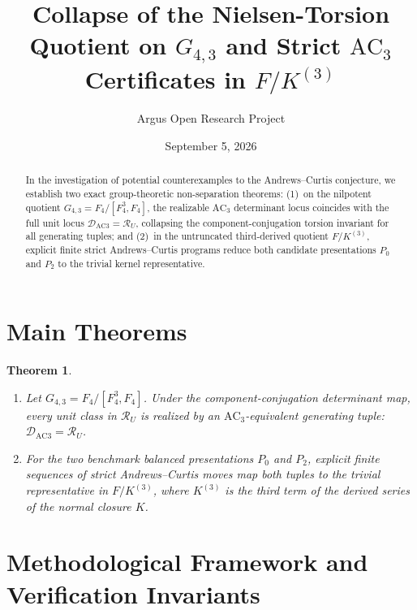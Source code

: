 \documentclass[10pt,reqno]{amsart}
\title[Collapse of a Nielsen-Torsion Quotient and $F/K^{(3)}$ Certificates for Andrews--Curtis]
{Collapse of the Nielsen-Torsion Quotient on $G_{4,3}$ and Strict $\mathrm{AC}_3$ Certificates in $F/K^{(3)}$}
\author{Argus Open Research Project}
\date{September 5, 2026}
\newtheorem{theorem}{Theorem}[section]
\theoremstyle{definition}
\begin{document}
\begin{abstract}
In the investigation of potential counterexamples to the Andrews--Curtis conjecture, we establish two exact group-theoretic non-separation theorems: (1)~on the nilpotent quotient $G_{4,3}=F_4/[F_4^3,F_4]$, the realizable $\mathrm{AC}_3$ determinant locus coincides with the full unit locus $\mathcal{D}_{\mathrm{AC3}}=\mathcal{R}_U$, collapsing the component-conjugation torsion invariant for all generating tuples; and (2)~in the untruncated third-derived quotient $F/K^{(3)}$, explicit finite strict Andrews--Curtis programs reduce both candidate presentations $P_0$ and $P_2$ to the trivial kernel representative.
\end{abstract}
\maketitle
\section{Main Theorems}
\begin{theorem}
\begin{enumerate}[label=\textup{(\arabic*)}]
  \item Let $G_{4,3}=F_4/[F_4^3,F_4]$. Under the component-conjugation determinant map, every unit class in $\mathcal{R}_U$ is realized by an $\mathrm{AC}_3$-equivalent generating tuple: $\mathcal{D}_{\mathrm{AC3}}=\mathcal{R}_U$.
  \item For the two benchmark balanced presentations $P_0$ and $P_2$, explicit finite sequences of strict Andrews--Curtis moves map both tuples to the trivial representative in $F/K^{(3)}$, where $K^{(3)}$ is the third term of the derived series of the normal closure $K$.
\end{enumerate}
\end{theorem}

\section{Methodological Framework and Verification Invariants}
\end{document}
